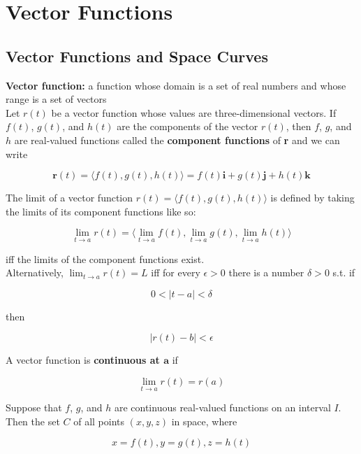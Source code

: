 \section{Vector Functions}


    \subsection{Vector Functions and Space Curves}      %

        \textbf{Vector function:} a function whose domain is a set of real numbers and whose range is a set of vectors \\

        Let $r(t)$ be a vector function whose values are three-dimensional vectors. If $f(t)$, $g(t)$, and $h(t)$ are the components of the vector $r(t)$, then $f$, $g$, and $h$ are real-valued functions called the
        \textbf{component functions} of \textbf{r} and we can write

        \[
            \mathbf{r}(t) = \langle f(t), g(t), h(t)\rangle = f(t)\mathbf{i} + g(t)\mathbf{j} + h(t) \mathbf{k}
        \]

        The limit of a vector function $r(t) = \langle f(t), g(t), h(t) \rangle$ is defined by taking the limits of its component functions like so:

        \[
            \lim_{t\to a} r(t) = \langle \lim_{t\to a} f(t), \lim_{t\to a}g(t), \lim_{t\to a}h(t)\rangle
        \]

        iff the limits of the component functions exist. \\

        Alternatively, $\lim_{t\to a} r(t) = L$ iff for every $\epsilon > 0$ there is a number $\delta > 0$ s.t. if

        \[
            0 < |t - a| < \delta
        \]

        then

        \[
            |r(t) - b| < \epsilon
        \]

        A vector function  is \textbf{continuous at $\mathbf{a}$} if

        \[
            \lim_{t\to a} r(t) = r(a)
        \]

        Suppose that $f$, $g$, and $h$ are continuous real-valued functions on an interval $I$. Then the set $C$ of all points $(x,y,z)$ in space, where

        \[
            x = f(t), y = g(t), z = h(t)
        \]

